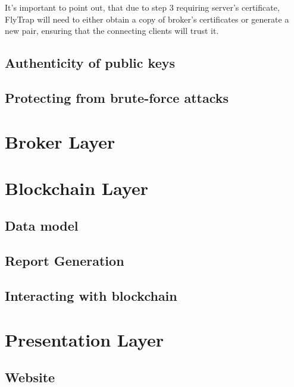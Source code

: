 It's important to point out, that due to step 3 requiring server's certificate, FlyTrap will need to either obtain a copy of broker's certificates or generate a new pair, ensuring that the connecting clients will trust it.

\subsection{Authenticity of public keys}

\subsection{Protecting from brute-force attacks}

\section{Broker Layer}
\section{Blockchain Layer}
\subsection{Data model}
\subsection{Report Generation}
\subsection{Interacting with blockchain}
\section{Presentation Layer}
\subsection{Website}